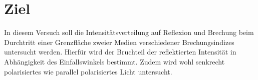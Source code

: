 \section{Ziel}
\label{sec:Ziel}

In diesem Versuch soll die Intensitätsverteilung auf Reflexion und Brechung beim Durchtritt einer Grenzfläche zweier Medien verschiedener 
Brechungsindizes untersucht werden. Hierfür wird der Bruchteil der reflektierten Intensität in Abhängigkeit des Einfallswinkels bestimmt. Zudem 
wird wohl senkrecht polarisiertes wie parallel polarisiertes Licht untersucht.